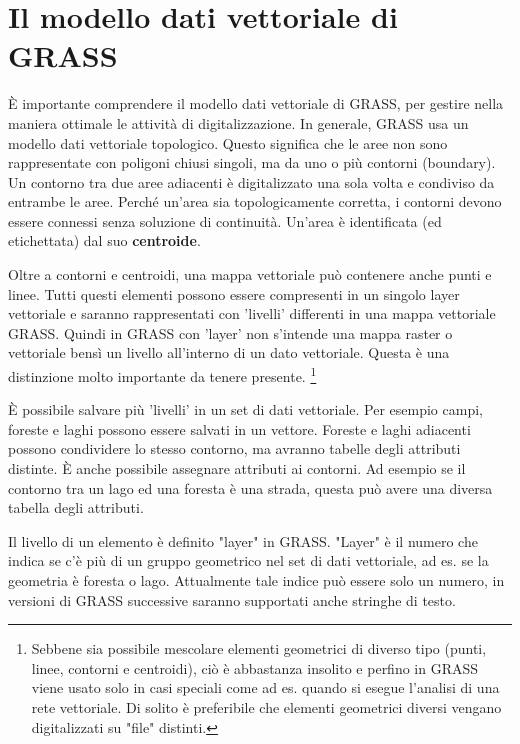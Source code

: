 \section{Il modello dati vettoriale di GRASS}\label{label_vectmodel}

È importante comprendere il modello dati vettoriale di GRASS, per gestire nella 
maniera ottimale le attività di digitalizzazione. 
In generale, GRASS usa un modello dati vettoriale topologico. 
Questo significa che le aree non sono rappresentate con poligoni chiusi singoli, 
ma da uno o più contorni (boundary). Un  contorno tra due aree adiacenti è digitalizzato una
sola volta e condiviso da entrambe le aree. Perché un'area sia topologicamente corretta, 
i contorni devono essere connessi senza soluzione di continuità. Un'area è identificata 
(ed etichettata) dal suo \textbf{centroide}.

Oltre a contorni e centroidi, una mappa vettoriale può contenere anche punti e
linee. Tutti questi elementi possono essere compresenti in un singolo layer
vettoriale e saranno rappresentati con 'livelli' differenti in una mappa vettoriale GRASS. 
Quindi in GRASS con 'layer' non s'intende una mappa raster o vettoriale bensì un livello 
all'interno di un dato vettoriale.
Questa è una distinzione molto importante da tenere presente.
\footnote{Sebbene sia possibile mescolare elementi geometrici di diverso tipo
(punti, linee, contorni e centroidi), ciò è abbastanza insolito e perfino in
GRASS viene usato solo in casi speciali come ad es. quando si esegue l'analisi
di una rete vettoriale. Di solito è preferibile che elementi geometrici
diversi vengano digitalizzati su "file" distinti.}

È possibile salvare più 'livelli' in un set di dati vettoriale. Per esempio
campi, foreste e laghi possono essere salvati in un vettore. Foreste e
laghi adiacenti possono condividere lo stesso contorno, ma avranno tabelle degli
attributi distinte. È anche possibile assegnare attributi ai contorni. Ad
esempio se il contorno tra un lago ed una foresta è una strada, questa può avere una
diversa tabella degli attributi.
 
Il livello di un elemento è definito "layer" in GRASS. "Layer" è il numero che 
indica se c'è più di un gruppo geometrico nel set di dati vettoriale, ad es. se 
la geometria è foresta o lago. Attualmente tale indice può essere
solo un numero, in versioni di GRASS successive saranno supportati anche stringhe di testo.

